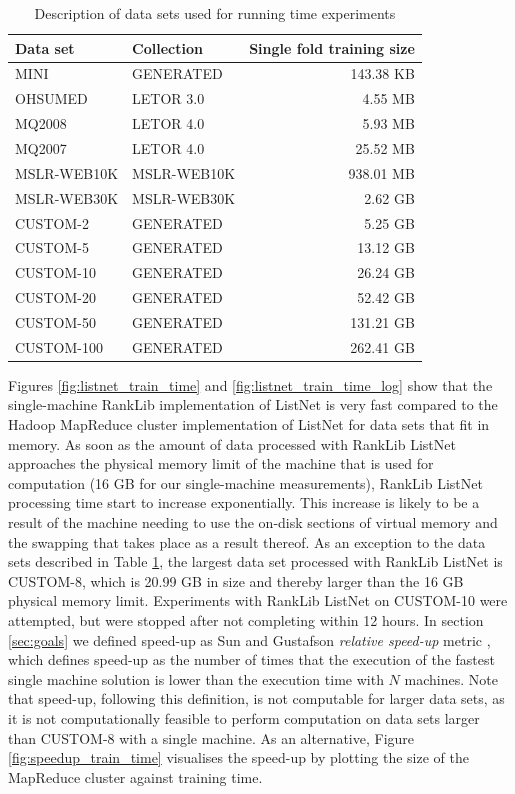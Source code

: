\begin{table}
\centering
\begin{tabular}{p{3.4cm}p{3.4cm}r}\toprule
Data set & Collection & Single fold training size \\
\midrule
MINI		& GENERATED		  & 143.38 KB\\
OHSUMED     & LETOR 3.0       &   4.55 MB\\
MQ2008      & LETOR 4.0       &   5.93 MB\\
MQ2007      & LETOR 4.0       &  25.52 MB\\
MSLR-WEB10K & MSLR-WEB10K     & 938.01 MB\\
MSLR-WEB30K & MSLR-WEB30K     &   2.62 GB\\
CUSTOM-2	& GENERATED		  &   5.25 GB\\
CUSTOM-5	& GENERATED		  &  13.12 GB\\
CUSTOM-10	& GENERATED		  &  26.24 GB\\
CUSTOM-20   & GENERATED       &  52.42 GB\\
CUSTOM-50	& GENERATED		  & 131.21 GB\\
CUSTOM-100	& GENERATED		  & 262.41 GB\\
\bottomrule
\end{tabular}
\caption{Description of data sets used for running time experiments}
\label{tbl:recap_datasets}
\end{table}

Figures \ref{fig:listnet_train_time} and \ref{fig:listnet_train_time_log} show that the single-machine RankLib implementation of ListNet is very fast compared to the Hadoop MapReduce cluster implementation of ListNet for data sets that fit in memory. As soon as the amount of data processed with RankLib ListNet approaches the physical memory limit of the machine that is used for computation (16 GB for our single-machine measurements), RankLib ListNet processing time start to increase exponentially. This increase is likely to be a result of the machine needing to use the on-disk sections of virtual memory and the swapping that takes place as a result thereof. As an exception to the data sets described in Table \ref{tbl:recap_datasets}, the largest data set processed with RankLib ListNet is CUSTOM-8, which is 20.99 GB in size and thereby larger than the 16 GB physical memory limit. Experiments with RankLib ListNet on CUSTOM-10 were attempted, but were stopped after not completing within 12 hours. In section \ref{sec:goals} we defined speed-up as Sun and Gustafson \emph{relative speed-up} metric \cite{Sun1991}, which defines speed-up as the number of times that the execution of the fastest single machine solution is lower than the execution time with $N$ machines. Note that speed-up, following this definition, is not computable for larger data sets, as it is not computationally feasible to perform computation on data sets larger than CUSTOM-8 with a single machine. As an alternative, Figure \ref{fig:speedup_train_time} visualises the speed-up by plotting the size of the MapReduce cluster against training time.\\


